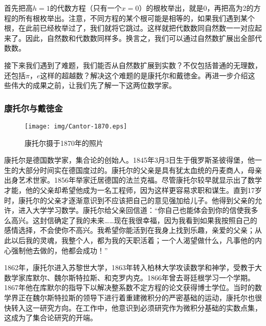 \documentclass{article}
\begin{document}
\begin{enumerate}
首先把高$h=1$的代数方程（只有一个$x = 0$）的根枚举出，就是0，再把高为2的方程的所有根枚举出。注意，不同方程的某个根可能是相等的，如果我们遇到某个根，在此前已经枚举过了，我们就将它跳过。这样就把代数数同自然数一一对应起来了。因此，自然数和代数数同样多。换言之，我们可以通过自然数扩展出全部代数数。
\end{enumerate}

接下来我们遇到了难题，我们能否从自然数扩展到实数？不仅包括普通的无理数，还包括$\pi$，$e$这样的超越数？解决这个难题的是康托尔和戴徳金。再进一步介绍这些伟大的成果之前，让我们先了解一下这两位数学家。

\subsubsection{康托尔与戴徳金}

\begin{wrapfigure}{R}{0.4\textwidth}
 \centering
 \texttt{[image: img/Cantor-1870.eps]}
 \captionsetup{labelformat=empty}
 \caption{康托尔摄于1870年的照片}
 \label{fig:Cantor-1870}
\end{wrapfigure}

康托尔是德国数学家，集合论的创始人。1845年3月3日生于俄罗斯圣彼得堡，他一生的大部分时间实在德国度过的。康托尔的父亲是具有犹太血统的丹麦商人，母亲出身艺术世家。1856年举家迁居德国的法兰克福。尽管康托尔较早就显示出了数学才能，他的父亲却希望他成为一名工程师，因为这样更容易求职和谋生。直到17岁时，康托尔的父亲才逐渐意识到不应该把自己的意见强加给儿子。他得到父亲的允许，进入大学学习数学。康托尔给父亲回信道：“你自己也能体会到你的信使我多么高兴。这封信确定了我的未来……现在我很幸福，因为我看到如果我按照自己的感情选择，不会使你不高兴。我希望你能活到在我身上找到乐趣，亲爱的父亲；从此以后我的灵魂，我整个人，都为我的天职活着；一个人渴望做什么，凡事他的内心强制他去做的，他都会成功！”\cite{HanXueTao16}

1862年，康托尔进入苏黎世大学，1863年转入柏林大学攻读数学和神学，受教于大数学家库默尔、魏尔斯特拉斯、和克罗内克。1866年曾去哥廷根学习一个学期。1867年他在库默尔的指导下以解决整系数不定方程的论文获得博士学位。当时的数学界正在魏尔斯特拉斯的领导下进行着重建微积分的严密基础的运动，康托尔也很快转入这一研究方向。在工作中，他意识到必须研究作为微积分基础的实数点集，这成为了集合论研究的开端。
\end{document}
